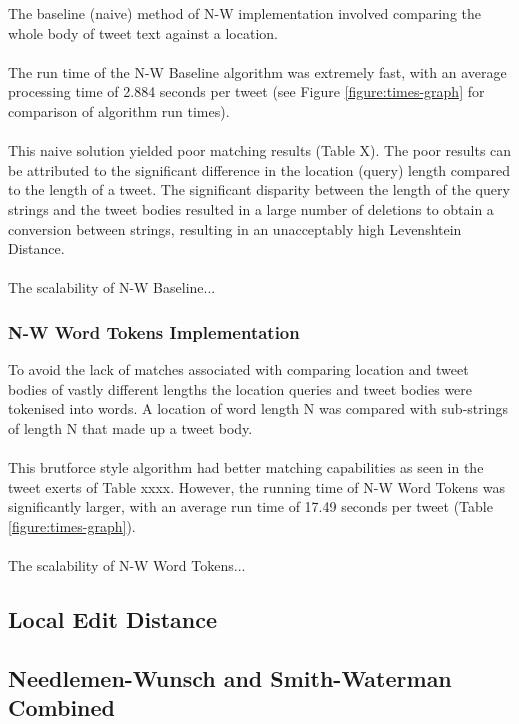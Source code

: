 \documentclass[11pt,a4paper]{article}
\begin{document}
The baseline (naive) method of N-W implementation involved comparing the whole body of tweet text against a location.\\\\
The run time of the N-W Baseline algorithm was extremely fast, with an average processing time of 2.884 seconds per tweet (see Figure \ref{figure:times-graph} for comparison of algorithm run times).\\\\ 
This naive solution yielded poor matching results (Table X). The poor results can be attributed to the significant difference in the location (query) length compared to the length of a tweet. The significant disparity between the length of the query strings and the tweet bodies resulted in a large number of deletions to obtain a conversion between strings, resulting in an unacceptably high Levenshtein Distance.\\\\
The scalability of N-W Baseline...



\subsubsection{N-W Word Tokens Implementation}

To avoid the lack of matches associated with comparing location and tweet bodies of vastly different lengths the location queries and tweet bodies were tokenised into words. A location of word length N was compared with sub-strings of length N that made up a tweet body.\\\\
This brutforce style algorithm had better matching capabilities as seen in the tweet exerts of Table xxxx. However, the running time of N-W Word Tokens was significantly larger, with an average run time of 17.49 seconds per tweet (Table \ref{figure:times-graph}).\\\\
The scalability of N-W Word Tokens...


\subsection{Local Edit Distance}

\subsection{Needlemen-Wunsch and Smith-Waterman Combined}
\end{document}
